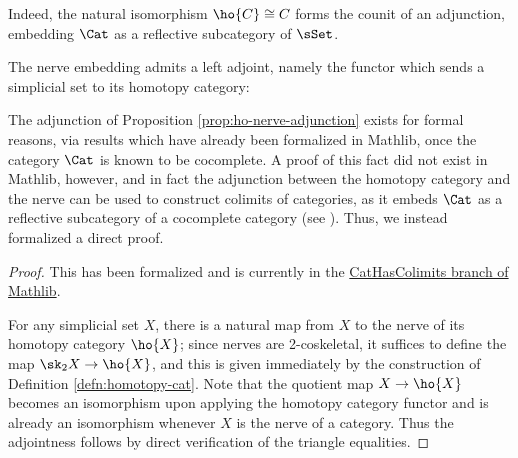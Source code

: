    Indeed, the natural isomorphism $\ho{C} \cong C$ forms the counit of an adjunction, embedding $\Cat$ as a reflective subcategory of $\sSet$.

   \begin{proposition}\label{prop:ho-nerve-adjunction}
    \leanok
    The nerve embedding admits a left adjoint, namely the functor which sends a simplicial set to its homotopy category:
   \begin{center}
   \end{center}
   \end{proposition}

   The adjunction of Proposition \ref{prop:ho-nerve-adjunction} exists for formal reasons, via results which have already been formalized in Mathlib, %
   once the category $\Cat$ is known to be cocomplete. A proof of this fact did not exist in Mathlib, however, and in fact the adjunction between the homotopy category and the nerve can be used to construct colimits of categories, as it embeds $\Cat$ as a reflective subcategory of a cocomplete category (see \cite[4.5.16]{Riehl:2016cc}). Thus, we instead formalized a direct proof.

   \begin{proof}
    \leanok
    This has been formalized and is currently in the \href{https://github.com/leanprover-community/mathlib4/tree/CatHasColimits}{CatHasColimits branch of Mathlib}.

   For any simplicial set $X$, there is a natural map from $X$ to the nerve of its homotopy category $\ho{X}$; since nerves are 2-coskeletal, it suffices to define the map $\sk_2X \to \ho{X}$, and this is given immediately by the construction of Definition \ref{defn:homotopy-cat}. Note that the quotient map $X \to \ho{X}$ becomes an isomorphism upon applying the homotopy category functor and is already an isomorphism whenever $X$ is the nerve of a category. Thus the adjointness follows %
    by direct verification of the triangle equalities.
 \end{proof}


